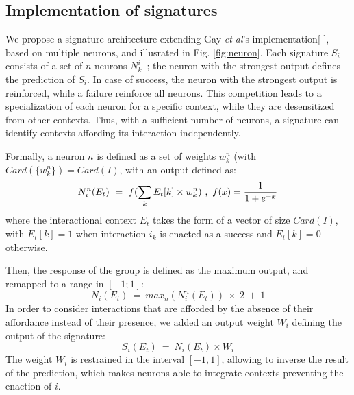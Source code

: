 \documentclass[conference]{IEEEtran}
\begin{document}


\subsection{Implementation of signatures}\label{contexts}


We propose a signature architecture extending Gay \textit{et al}'s implementation[ ], based on multiple neurons, and illusrated in Fig. \ref{fig:neuron}. Each signature $S_i$ consists of a set of $n$ neurons $N_k^i$~; the neuron with the strongest output defines the prediction of $S_i$. In case of success, the neuron with the strongest output is reinforced, while a failure reinforce all neurons. This competition leads to a specialization of each neuron for a specific context, while they are desensitized from other contexts. Thus, with a sufficient number of neurons, a signature can identify contexts affording its interaction independently.

Formally, a neuron $n$ is defined as a set of weights $w_k^n$ (with $Card(\{w_k^n\})=Card(I)$, with an output defined as:
\begin{equation}
N_i^n(E_t)~=~f(\sum_{k} E_t[k] \times w_k^n)~,~ f(x) = { {1}\over{1+e^{-x} }}
\end{equation}
where the interactional context $E_t$ takes the form of a vector of size $Card(I)$, with $E_t[k]=1$ when interaction $i_k$ is enacted as a success and $E_t[k]=0$ otherwise.

Then, the response of the group is defined as the maximum output, and remapped to a range in $[-1;1]$:
\begin{equation}
N_i(E_t)~=~max_n (N_i^n(E_t) ) \: \times \: 2 ~+~ 1
\end{equation}
In order to consider interactions that are afforded by the absence of their affordance instead of their presence, we added an output weight $W_i$ defining the output of the signature:
\begin{equation}
S_i(E_t)~=~N_i(E_t) \times W_i
\end{equation}
The weight $W_i$ is restrained in the interval $[-1,1]$, allowing to inverse the result of the prediction, which makes neurons able to integrate contexts preventing the enaction of $i$.
\end{document}
